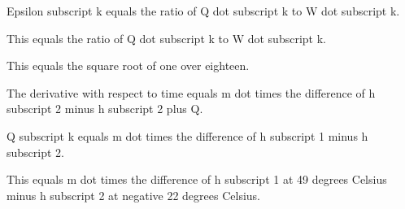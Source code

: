 Epsilon subscript k equals the ratio of Q dot subscript k to W dot subscript k.

This equals the ratio of Q dot subscript k to W dot subscript k.

This equals the square root of one over eighteen.

The derivative with respect to time equals m dot times the difference of h subscript 2 minus h subscript 2 plus Q.

Q subscript k equals m dot times the difference of h subscript 1 minus h subscript 2.

This equals m dot times the difference of h subscript 1 at 49 degrees Celsius minus h subscript 2 at negative 22 degrees Celsius.
